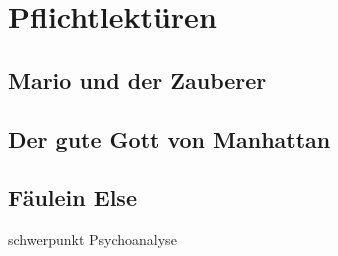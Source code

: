 
\section{Pflichtlektüren}

\subsection{Mario und der Zauberer}

\subsection{Der gute Gott von Manhattan}

\subsection{Fäulein Else}
schwerpunkt Psychoanalyse
